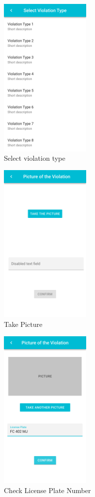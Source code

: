 \documentclass{article}
\begin{document}
\begin{figure}[!htb]
		\centering
		\includegraphics[height=7.9cm,keepaspectratio]{images/mockups/Violation_Type_Menu.png}
		\caption{Select violation type}
\end{figure}

\clearpage
\begin{figure}[!htb]
		\centering
		\includegraphics[height=7.9cm,keepaspectratio]{images/mockups/Create_Report_take_picture.png}
		\caption{Take Picture}
\end{figure}

\begin{figure}[!htb]
		\centering
		\includegraphics[height=7.9cm,keepaspectratio]{images/mockups/Create_Report_after_picture.png}
		\caption{Check License Plate Number}
\end{figure}
\end{document}

